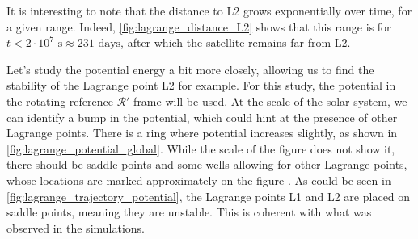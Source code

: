 It is interesting to note that the distance to L2 grows exponentially over time, for a given range. Indeed, \autoref{fig:lagrange_distance_L2} shows that this range is for \(t < 2 \cdot 10^7 \textrm{ s} \approx 231 \textrm{ days}\), after which the satellite remains far from L2.

Let's study the potential energy a bit more closely, allowing us to find the stability of the Lagrange point L2 for example. For this study, the potential in the rotating reference \(\mathcal R'\) frame will be used. At the scale of the solar system, we can identify a bump in the potential, which could hint at the presence of other Lagrange points. There is a ring where potential increases slightly, as shown in \autoref{fig:lagrange_potential_global}. While the scale of the figure does not show it, there should be saddle points and some wells allowing for other Lagrange points, whose locations are marked approximately on the figure \cite{lagrange}. As could be seen in \autoref{fig:lagrange_trajectory_potential}, the Lagrange points L1 and L2 are placed on saddle points, meaning they are unstable. This is coherent with what was observed in the simulations.

